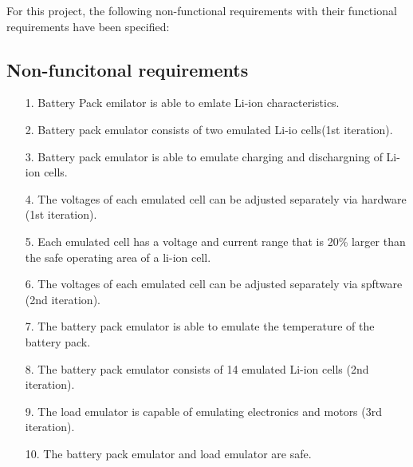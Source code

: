 \IEEEPARstart
{F}{or} this project, the following non-functional requirements with their 
functional requirements have been specified:

\subsection{Non-funcitonal requirements}
\begin{enumerate}
    \item[1.] Battery Pack emilator is able to emlate Li-ion characteristics.
    \item[2.] Battery pack emulator consists of two emulated Li-io 
    cells(1st iteration).
    \item[3.] Battery pack emulator is able to emulate charging and dischargning of
    Li-ion cells.
    \item[4.] The voltages of each emulated cell can be adjusted separately 
    via hardware (1st iteration).
    \item[5.] Each emulated cell has a voltage and current range that is 20\%
    larger than the safe operating area of a li-ion cell.
    \item[6.] The voltages of each emulated cell can be adjusted separately 
    via spftware (2nd iteration).
    \item[7.] The battery pack emulator is able to emulate the temperature of 
    the battery pack.
    \item[8.] The battery pack emulator consists of 14 emulated Li-ion 
    cells (2nd iteration). 
    \item[9.] The load emulator is capable of emulating electronics and 
    motors (3rd iteration).
    \item[10.] The battery pack emulator and load emulator are safe. 
  \end{enumerate}

